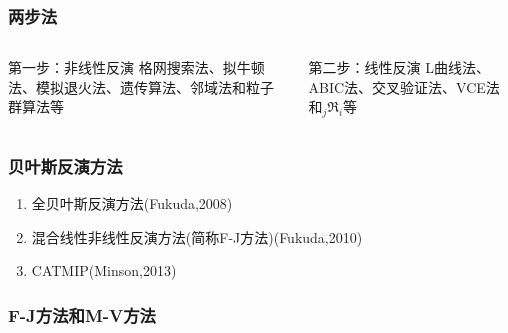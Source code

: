 ﻿\documentclass{beamer}
\begin{document}
\begin{frame}
\frametitle{两步法}

\begin{columns}


\begin{minipage}[c][0.35\textheight][c]{\linewidth}
\begin{block}{第一步：非线性反演}
格网搜索法、拟牛顿法、模拟退火法、遗传算法、邻域法和粒子群算法等
\end{block}
\end{minipage}

\begin{minipage}[c][0.35\textheight][c]{\linewidth}
\begin{block}{第二步：线性反演}
L曲线法、ABIC法、交叉验证法、VCE法和$_j\Re_i$等
\end{block}
\end{minipage}


\end{columns}

\end{frame}
\begin{frame}
\frametitle{贝叶斯反演方法}
\begin{enumerate}
  \item 全贝叶斯反演方法(Fukuda,2008)
  \item 混合线性非线性反演方法(简称F-J方法)(Fukuda,2010)
  \item CATMIP(Minson,2013)
\end{enumerate}
\end{frame}
\begin{frame}
\frametitle{F-J方法和M-V方法}
\begin{table}
  \caption{Parameters solved by Different Methods}
  \label{Tab:Relation_FJ_MV}
\end{table}
\end{frame}
\end{document}
